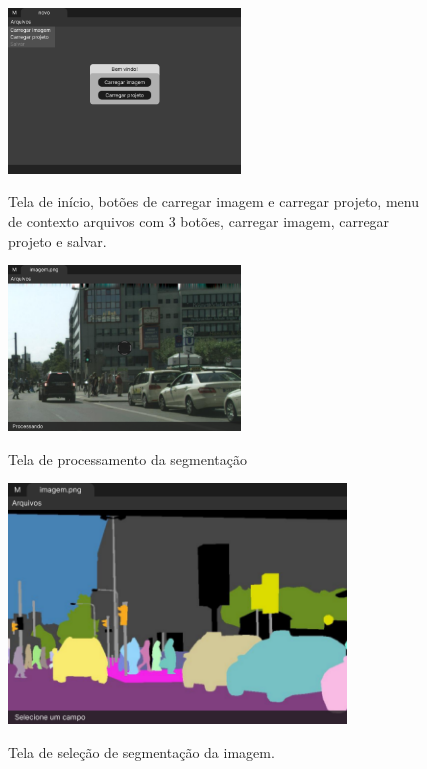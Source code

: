 \begin{figure}[H]
	\centering
    \caption{Tela de início, botões de carregar imagem e carregar projeto, menu de contexto arquivos com 3 botões, carregar imagem, carregar projeto e salvar.}
	\includegraphics[width=0.55\textwidth]{figures/tela_novo.png}
	\label{fig:tela_novo}
\end{figure}


\begin{figure}[H]
	\centering
    \caption{Tela de processamento da segmentação}
	\includegraphics[width=0.55\textwidth]{figures/tela_processando_1.png}
	\label{fig:tela_processando_1}
\end{figure}


\begin{figure}[H]
	\centering
    \caption{Tela de seleção de segmentação da imagem.}
	\includegraphics[width=0.8\textwidth]{figures/tela_carregado.png}
	\label{fig:tela_carregado}
\end{figure}


